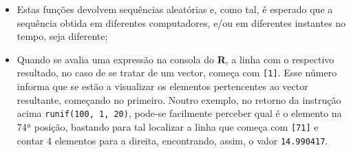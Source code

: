 \documentclass{exam}
\begin{document}
\begin{questions}
\begin{solution}
\begin{itemize}
		\item Estas funções devolvem sequências aleatórias e, como tal, é esperado que a sequência obtida em diferentes computadores, e/ou em diferentes instantes no tempo, seja diferente;
		\item Quando se avalia uma expressão na consola do \textbf{R}, a linha com o respectivo resultado, no caso de se tratar de um vector, começa com \texttt{[1]}. Esse número informa que se estão a visualizar os elementos pertencentes ao vector resultante, começando no primeiro. Noutro exemplo, no retorno da instrução acima \texttt{runif(100, 1, 20)}, pode-se facilmente perceber qual é o elemento na 74ª posição, bastando para tal localizar a linha que começa com \texttt{[71]} e contar 4 elementos para a direita, encontrando, assim, o valor \texttt{14.990417}.
	\end{itemize}
	
\end{solution}

\end{questions}
\end{document}
